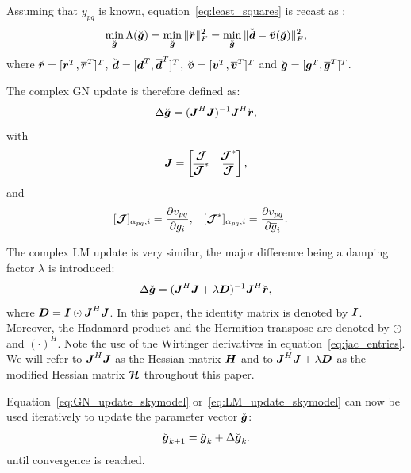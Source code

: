 \documentclass[useAMS,usenatbib]{mn2e}
\newcommand{\br}{\bmath{r}}
\newcommand{\bg}{\bmath{g}}
\newcommand{\bd}{\bmath{d}}
\newcommand{\bv}{\bmath{v}}
\newcommand{\bJ}{\bmath{J}}
\newcommand{\bD}{\bmath{D}}
\newcommand{\bH}{\bmath{H}}
\newcommand{\bI}{\bmath{I}}
\newcommand{\bmJ}{\bmath{\mathcal{J}}}
\newcommand{\bmH}{\bmath{\mathcal{H}}}
\newcommand{\conj}[1]{\overline{#1}}
\begin{document}
Assuming that $y_{pq}$ is known, equation~\ref{eq:least_squares} is recast as \citep{Smirnov2015}:
\begin{equation}
\label{eq:least_squares_augmented}
\min_{\breve{\bg}} \Lambda(\breve{\bg}) = \min_{\breve{\bg}} \|\breve{\br}\|_F^2 = \min_{\breve{\bg}} \|\breve{\bd} - \breve{\bv}(\breve{\bg})\|_F^2, 
\end{equation} 
where $\breve{\br} = [\br^T,\conj{\br}^T]^T$, $\breve{\bd} = [\bd^T,\conj{\bd}^T]^T$, $\breve{\bv} = [\bv^T,\conj{\bv}^T]^T$ and $\breve{\bg} = [\bg^T,\conj{\bg}^T]^T$.

The complex GN update is therefore defined as:
\begin{equation}
\label{eq:GN_update_skymodel}
 \Delta \breve{\bg} = (\bJ^H\bJ)^{-1}\bJ^H\breve{\br},
\end{equation}
with 
\begin{equation}
\label{eq:Jacobian_skymodel}
\bJ = \begin{bmatrix}
       \bmJ & \bmJ^*\\
       \conj{\bmJ}^* & \conj{\bmJ} 
      \end{bmatrix},
\end{equation}
and
\begin{align}
\label{eq:jac_entries}
[\bmJ]_{\alpha_{pq},i} &= \frac{\partial v_{pq}}{\partial g_i}, & [\bmJ^*]_{\alpha_{pq},i} &= \frac{\partial v_{pq}}{\partial \conj{g}_i}. 
\end{align}

The complex LM update is very similar, the major difference being a damping factor $\lambda$ is introduced:
\begin{equation}
\label{eq:LM_update_skymodel}
\Delta \breve{\bg} = (\bJ^H\bJ + \lambda\bD)^{-1}\bJ^H\breve{\br},
\end{equation}
where $\bD=\bI\odot\bJ^H\bJ$. In this paper, the identity matrix is denoted by $\bI$. Moreover, the Hadamard product and the Hermition transpose are denoted by $\odot$ and $(\cdot)^H$. Note the use of the Wirtinger derivatives in equation~\ref{eq:jac_entries}.
We will refer to $\bJ^H\bJ$ as the Hessian matrix $\bH$ and to $\bJ^H\bJ + \lambda\bD$ as the modified Hessian matrix $\bmH$ throughout this paper. 

Equation~\ref{eq:GN_update_skymodel} or~\ref{eq:LM_update_skymodel} can now be used iteratively to update the parameter vector $\breve{\bg}$:
\begin{equation}
\label{eq:update_skymodel}
\breve{\bg}_{k+1} = \breve{\bg}_{k} + \Delta \breve{\bg}_{k}. 
\end{equation}
until convergence is reached.
\end{document}
